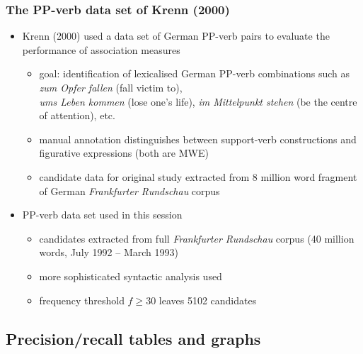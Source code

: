 \documentclass[handout,notes=show,t]{beamer} %
\begin{document}
\begin{frame}
  \frametitle{The PP-verb data set of Krenn (2000)}

  \begin{itemize}
  \item Krenn (2000) used a data set of German PP-verb pairs to evaluate
    the performance of association measures
    \begin{itemize}
    \item goal: identification of lexicalised German PP-verb combinations such
      as \emph{zum Opfer fallen} (fall victim to),\\ \emph{ums Leben kommen}
      (lose one's life), \emph{im Mittelpunkt stehen} (be the centre of
      attention), etc.
    \item manual annotation distinguishes between support-verb constructions
      and figurative expressions (both are MWE)
    \item candidate data for original study extracted from 8 million word
      fragment of German \emph{Frankfurter Rundschau} corpus
    \end{itemize}
  \item PP-verb data set used in this session
    \begin{itemize}
    \item candidates extracted from full \emph{Frankfurter Rundschau} corpus
      (40 million words, July 1992 -- March 1993)
    \item more sophisticated syntactic analysis used
    \item frequency threshold $f\geq 30$ leaves 5102 candidates
    \end{itemize}
  \end{itemize}
\end{frame}

\subsection{Precision/recall tables and graphs}
\end{document}
